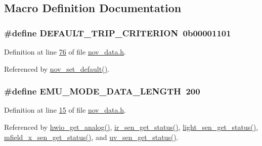 \subsection{Macro Definition Documentation}
\hypertarget{a00022_a0ff9495f8521ea7698e83e7b4d6a6985}{
\subsubsection[{D\+E\+F\+A\+U\+L\+T\+\_\+\+T\+R\+I\+P\+\_\+\+C\+R\+I\+T\+E\+R\+I\+O\+N}]{\setlength{\rightskip}{0pt plus 5cm}\#define D\+E\+F\+A\+U\+L\+T\+\_\+\+T\+R\+I\+P\+\_\+\+C\+R\+I\+T\+E\+R\+I\+O\+N~0b00001101}}\label{a00022_a0ff9495f8521ea7698e83e7b4d6a6985}


Definition at line \hyperlink{a00022_source_l00076}{76} of file \hyperlink{a00022_source}{nov\+\_\+data.\+h}.



Referenced by \hyperlink{a00060_source_l00760}{nov\+\_\+set\+\_\+default()}.

\hypertarget{a00022_af4c3a8ad94feb4d7bda7f107f34baf41}{
\subsubsection[{E\+M\+U\+\_\+\+M\+O\+D\+E\+\_\+\+D\+A\+T\+A\+\_\+\+L\+E\+N\+G\+T\+H}]{\setlength{\rightskip}{0pt plus 5cm}\#define E\+M\+U\+\_\+\+M\+O\+D\+E\+\_\+\+D\+A\+T\+A\+\_\+\+L\+E\+N\+G\+T\+H~200}}\label{a00022_af4c3a8ad94feb4d7bda7f107f34baf41}


Definition at line \hyperlink{a00022_source_l00015}{15} of file \hyperlink{a00022_source}{nov\+\_\+data.\+h}.



Referenced by \hyperlink{a00056_source_l00223}{hwio\+\_\+get\+\_\+analog()}, \hyperlink{a00045_source_l00302}{ir\+\_\+sen\+\_\+get\+\_\+status()}, \hyperlink{a00047_source_l00204}{light\+\_\+sen\+\_\+get\+\_\+status()}, \hyperlink{a00050_source_l00276}{mfield\+\_\+x\+\_\+sen\+\_\+get\+\_\+status()}, and \hyperlink{a00073_source_l00302}{uv\+\_\+sen\+\_\+get\+\_\+status()}.

